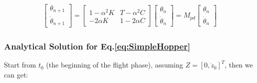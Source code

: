 \begin{align}
\label{eq:PoincareMapPD}
\begin{bmatrix}
\theta_{n+1}  \\
\dot \theta_{n+1}
\end{bmatrix} = \begin{bmatrix}
1-\alpha^2 K & T-\alpha^2 C \\
-2\alpha K & 1-2\alpha C
\end{bmatrix}\begin{bmatrix}
 \theta_n  \\
\dot \theta_n 
\end{bmatrix} = M_{pd}
\begin{bmatrix}
 \theta_n  \\
\dot \theta_n 
\end{bmatrix}
\end{align}









\pagebreak
\subsubsection{Analytical Solution for Eq.\ref{eq:SimpleHopper}}
Start from $t_0$ (the beginning of the flight phase), assuming $Z = [0, \dot z_0]^T$, then we can get:

